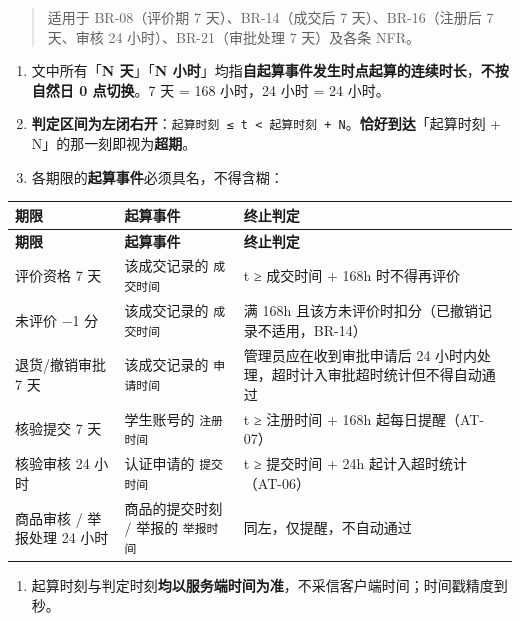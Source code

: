 \documentclass[12pt,a4paper]{ctexart}
\begin{document}
\begin{quote}\small
适用于 BR-08（评价期 7 天）、BR-14（成交后 7 天）、BR-16（注册后 7 天、审核 24 小时）、BR-21（审批处理 7 天）及各条 NFR。

\end{quote}

\begin{enumerate}[leftmargin=1.9em,itemsep=1pt,topsep=2pt]
\item 文中所有「\textbf{N 天}」「\textbf{N 小时}」均指\textbf{自起算事件发生时点起算的连续时长}，\textbf{不按自然日 0 点切换}。7 天 = 168 小时，24 小时 = 24 小时。
\item \textbf{判定区间为左闭右开}：\texttt{起算时刻 ≤ t < 起算时刻 + N}。\textbf{恰好到达}「起算时刻 + N」的那一刻即视为\textbf{超期}。
\item 各期限的\textbf{起算事件}必须具名，不得含糊：
\end{enumerate}

{\footnotesize
\begin{longtable}{|p{3.81cm}|p{4.31cm}|p{7.88cm}|}
\hline
\textbf{期限} & \textbf{起算事件} & \textbf{终止判定} \\
\hline
\endfirsthead
\hline
\textbf{期限} & \textbf{起算事件} & \textbf{终止判定} \\
\hline
\endhead
\hline
\endfoot
评价资格 7 天 & 该成交记录的 \texttt{成交时间} & t ≥ 成交时间 + 168h 时不得再评价 \\
\hline
未评价 −1 分 & 该成交记录的 \texttt{成交时间} & 满 168h 且该方未评价时扣分（已撤销记录不适用，BR-14） \\
\hline
退货/撤销审批 7 天 & 该成交记录的 \texttt{申请时间} & 管理员应在收到审批申请后 24 小时内处理，超时计入审批超时统计但不得自动通过 \\
\hline
核验提交 7 天 & 学生账号的 \texttt{注册时间} & t ≥ 注册时间 + 168h 起每日提醒（AT-07） \\
\hline
核验审核 24 小时 & 认证申请的 \texttt{提交时间} & t ≥ 提交时间 + 24h 起计入超时统计（AT-06） \\
\hline
商品审核 / 举报处理 24 小时 & 商品的提交时刻 / 举报的 \texttt{举报时间} & 同左，仅提醒，不自动通过 \\
\hline
\end{longtable}
}


\begin{enumerate}[leftmargin=1.9em,itemsep=1pt,topsep=2pt]
\item 起算时刻与判定时刻\textbf{均以服务端时间为准}，不采信客户端时间；时间戳精度到秒。
\end{enumerate}
\end{document}

